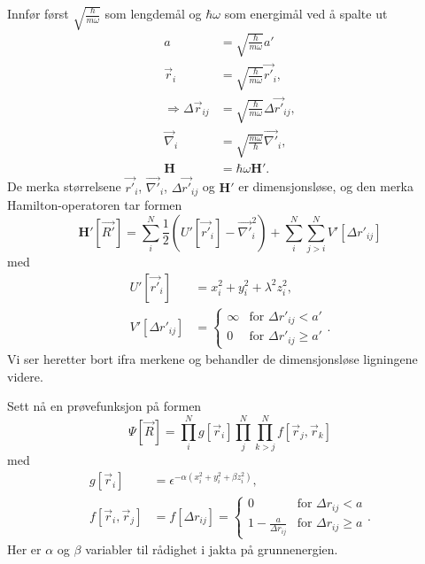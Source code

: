 \documentclass[pdftex,10pt,b5paper,twoside]{book}
\begin{document}
Innfør først $\sqrt{\frac{\hbar}{m\omega}}$ som lengdemål og $\hbar\omega$ som energimål ved å spalte ut
\begin{align}
a &= \sqrt{\frac{\hbar}{m\omega}}a' \\
\vec{r}_i &= \sqrt{\frac{\hbar}{m\omega}}\vec{r'}_i, \\
\Longrightarrow \Delta\vec{r}_{ij} &= \sqrt{\frac{\hbar}{m\omega}}\Delta\vec{r'}_{ij}, \\
\vec{\nabla}_i &= \sqrt{\frac{m\omega}{\hbar}}\vec{\nabla'}_i, \\
\mathbf{H} &= \hbar\omega\mathbf{H}'.
\end{align}
De merka størrelsene $\vec{r'}_i$, $\vec{\nabla'}_i$,  $\Delta\vec{r'}_{ij}$ og $\mathbf{H}'$ er dimensjonsløse, og den merka Hamilton-operatoren tar formen
\begin{equation}
\mathbf{H'}[\vec{R'}] = \sum\limits_i^N \frac{1}{2}\left( U'[\vec{r'}_i] - \vec{\nabla'}_i^2\right) + \sum\limits_i^N\sum\limits_{j > i}^N V'[\Delta{r'}_{ij}]
\end{equation}
med
\begin{align}
U'[\vec{r'}_i] &= x_i^2+y_i^2+\lambda^2z_i^2, \\
V'[\Delta{r'}_{ij}] &=\begin{cases} \infty & \text{for $\Delta{r'}_{ij} < a'$} \\
0 & \text{for $\Delta{r'}_{ij} \geq a'$} \end{cases}.
\end{align}
Vi ser heretter bort ifra merkene og behandler de dimensjonsløse ligningene videre.

Sett nå en prøvefunksjon på formen
\begin{equation}
\Psi[\vec{R}] = \prod\limits_i^N g[\vec{r}_i] \prod\limits_j^N\prod\limits_{k > j}^N f[\vec{r}_j,\vec{r}_k]
\end{equation}
med
\begin{align}
g[\vec{r}_i] &= \epsilon^{-\alpha\left(x_i^2+y_i^2+ \beta z_i^2\right)}, \\
f[\vec{r}_i,\vec{r}_j] &= f[\Delta{r}_{ij}] = \begin{cases} 0 & \text{for $\Delta{r}_{ij} < a$} \\
1-\frac{a}{\Delta{r}_{ij}} & \text{for $\Delta{r}_{ij} \geq a$} \end{cases}.
\end{align}
Her er $\alpha$ og $\beta$ variabler til rådighet i jakta på grunnenergien.
\end{document}
